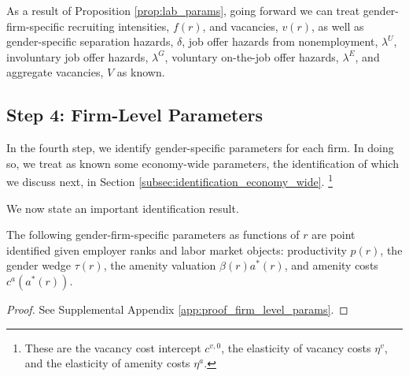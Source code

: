 As a result of Proposition \ref{prop:lab_params}, going forward we can treat gender-firm-specific recruiting intensities, $f(r)$, and vacancies, $v(r)$, as well as gender-specific separation hazards, $\delta$, job offer hazards from nonemployment, $\lambda^{U}$, involuntary job offer hazards, $\lambda^{G}$, voluntary on-the-job offer hazards, $\lambda^{E}$, and aggregate vacancies, $V$ as known.


\subsection{Step 4: Firm-Level Parameters\label{subsec:identification_continuous}}

In the fourth step, we identify gender-specific parameters for each firm. In doing so, we treat as known some economy-wide parameters, the identification of which we discuss next, in Section \ref{subsec:identification_economy_wide}.%
%
\footnote{These are the vacancy cost intercept $c^{v,0}$, the elasticity of vacancy costs $\eta^{v}$, and the elasticity of amenity costs $\eta^{a}$.} %
%

We now state an important identification result.

%
\newcommand{\PropFirmLevelParameters}{%
    The following gender-firm-specific parameters as functions of $r$ are point identified given employer ranks and labor market objects: productivity $p(r)$, the gender wedge $\tau(r)$, the amenity valuation $\beta(r) a^{*}(r)$, and amenity costs $c^{a}(a^{*}(r))$.%
}
%
\begin{proposition}
    \label{prop:identification}
    \PropFirmLevelParameters
\end{proposition}
%
\begin{proof}
    See Supplemental Appendix \ref{app:proof_firm_level_params}.
\end{proof}

